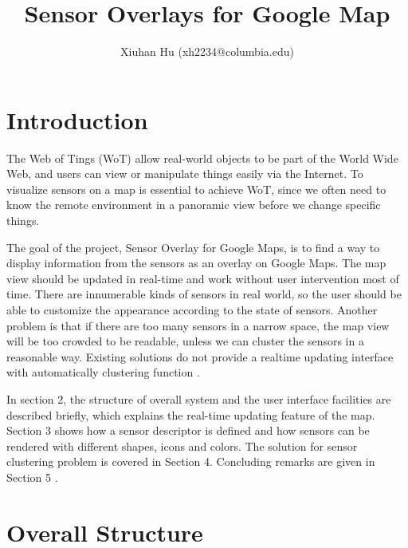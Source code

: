 \documentclass{article}
\begin{document}
\title{Sensor Overlays for Google Map}
\author{Xiuhan Hu (xh2234@columbia.edu)}
\maketitle
\mbox{}
\section{Introduction}

The Web of Tings (WoT) allow real-world objects to be part of the World Wide Web, and users can view or manipulate things easily via the Internet. To visualize sensors on a map is essential to achieve WoT, since we often need to know the remote environment in a panoramic view before we change specific things. 

The goal of the project, Sensor Overlay for Google Maps, is to find a way to display information from the sensors as an overlay on Google Maps. The map view should be updated in real-time and work without user intervention most of time. There are innumerable kinds of sensors in real world, so the user should be able to customize the appearance according to the state of sensors. Another problem is that if there are too many sensors in a narrow space, the map view will be too crowded to be readable, unless we can cluster the sensors in a reasonable way. Existing solutions do not provide a realtime updating interface with automatically clustering function \cite{nath2006sensormap}.

In section 2, the structure of overall system and the user interface facilities are described briefly, which explains the real-time updating feature of the map. Section 3 shows how a sensor descriptor is defined and how sensors can be rendered with different shapes, icons and colors. The solution for sensor clustering problem is covered in Section 4. Concluding remarks are given in Section 5 . 

\section{Overall Structure}
\end{document}
